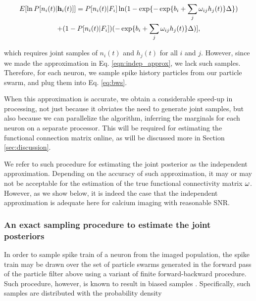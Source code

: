 \begin{multline} \label{eqn:bws}
	E [\ln P[n_i(t) | \mathbf{h}_i(t)]] = P[n_i(t) | F_i] \ln (1-\exp\{-\exp\{b_i + \sum_j \omega_{ij} h_j(t)\}\Delta\})
	\\ +  (1-P[n_i(t) | F_i]) (-\exp\{b_i + \sum_j \omega_{ij} h_j(t)\}\Delta)],
\end{multline}

\noindent which requires joint samples of $n_i(t)$ and $h_j(t)$ for all $i$ and $j$.  However, since we made the approximation in Eq. \eqref{eqn:indep_approx}, we lack such samples.  Therefore, for each neuron, we sample spike history particles from our particle swarm, and plug them into Eq. \eqref{eq:bws}.  


When this approximation is accurate, we obtain a considerable speed-up in processing, not just because it obviates the need to generate joint samples, but also because we can parallelize the algorithm, inferring the marginals for each neuron on a separate processor.  This will be required for estimating the functional connection matrix online, as will be discussed more in Section \ref{sec:discussion}.

%

We refer to such procedure for estimating the joint posterior as the independent approximation. Depending on the accuracy of such approximation, it may or may not be acceptable for the estimation of the true functional connectivity matrix $\mathbf{\omega}$. However, as we show below, it is indeed the case that the independent approximation is adequate here for calcium imaging with reasonable SNR.

\subsubsection{An exact sampling procedure to estimate the joint posteriors}

In order to sample spike train of a neuron from the imaged population, the spike train may be drawn over the set of particle swarms generated in the forward pass of the particle filter above using a variant of finite forward-backward procedure.  Such procedure, however, is known to result in biased samples \cite{Andrieu2007, NBR03}.
Specifically, such samples are distributed with the probability density

